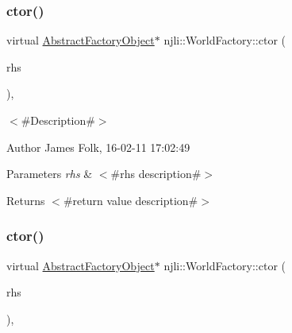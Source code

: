 \subsubsection{\texorpdfstring{ctor()}{ctor()}\hspace{0.1cm}{\footnotesize\ttfamily [3/4]}}
{\footnotesize\ttfamily virtual \mbox{\hyperlink{classnjli_1_1_abstract_factory_object}{Abstract\+Factory\+Object}}$\ast$ njli\+::\+World\+Factory\+::ctor (\begin{DoxyParamCaption}\item[{const \mbox{\hyperlink{classnjli_1_1_abstract_builder}{njli\+::\+Abstract\+Builder}} \&}]{rhs }\end{DoxyParamCaption})\hspace{0.3cm}{\ttfamily [protected]}, {\ttfamily [virtual]}}



$<$\#\+Description\#$>$ 

\begin{DoxyAuthor}{Author}
James Folk, 16-\/02-\/11 17\+:02\+:49
\end{DoxyAuthor}

\begin{DoxyParams}{Parameters}
{\em rhs} & $<$\#rhs description\#$>$\\
\hline
\end{DoxyParams}
\begin{DoxyReturn}{Returns}
$<$\#return value description\#$>$ 
\end{DoxyReturn}
\mbox{\label{classnjli_1_1_world_factory_a313445ddb5ed04a442bda2af7a6a1287}} 
\subsubsection{\texorpdfstring{ctor()}{ctor()}\hspace{0.1cm}{\footnotesize\ttfamily [4/4]}}
{\footnotesize\ttfamily virtual \mbox{\hyperlink{classnjli_1_1_abstract_factory_object}{Abstract\+Factory\+Object}}$\ast$ njli\+::\+World\+Factory\+::ctor (\begin{DoxyParamCaption}\item[{const \mbox{\hyperlink{classnjli_1_1_abstract_factory_object}{Abstract\+Factory\+Object}} \&}]{rhs }\end{DoxyParamCaption})\hspace{0.3cm}{\ttfamily [protected]}, {\ttfamily [virtual]}}



